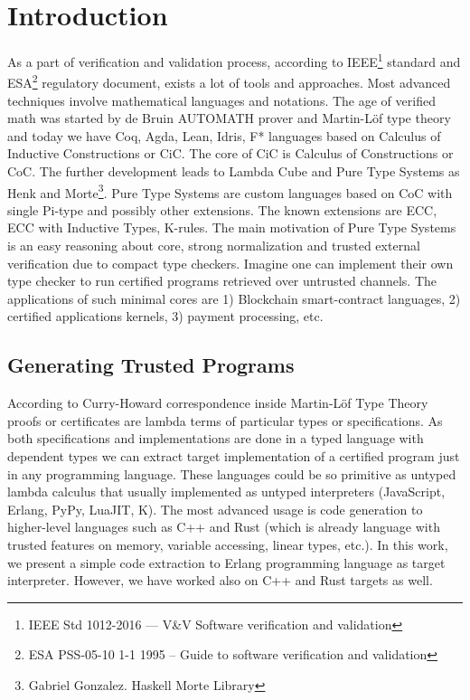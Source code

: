 \documentclass{aip-cp}
\begin{document}
\section{Introduction}
As a part of verification and validation process, according to IEEE\footnote{IEEE Std 1012-2016  --- V\&V Software verification and validation} standard
and ESA\footnote{ESA PSS-05-10 1-1 1995 -- Guide to software verification and validation} regulatory document,
exists a lot of tools and approaches. Most advanced techniques
involve mathematical languages and notations. The age of verified math was
started by de Bruin AUTOMATH prover and Martin-Löf\cite{Lof84} type theory and today we have Coq, Agda, Lean, Idris, F* languages
based on Calculus of Inductive Constructions or CiC\cite{Mohring15}.
The core of CiC is Calculus of Constructions or CoC\cite{Coq88}.
The further development leads to Lambda Cube\cite{Henk93} and Pure Type Systems as Henk\cite{Erik97} and Morte\footnote{Gabriel Gonzalez. Haskell Morte Library}.
Pure Type Systems are custom languages based on CoC with single Pi-type and possibly other extensions.
The known extensions are ECC, ECC with Inductive Types\cite{Ore92}, K-rules\cite{Barthe95}.
The main motivation of Pure Type Systems is an easy reasoning about core,
strong normalization and trusted external verification due to compact type checkers.
Imagine one can implement their own type checker to run certified
programs retrieved over untrusted channels. The applications of
such minimal cores are 1) Blockchain smart-contract languages,
2) certified applications kernels, 3) payment processing, etc.

\subsection{Generating Trusted Programs}
According to Curry-Howard correspondence inside Martin-Löf Type Theory\cite{Lof84}
proofs or certificates are lambda terms of particular types or specifications.
As both specifications and implementations are done in a typed
language with dependent types we can extract target implementation of a certified program just
in any programming language. These languages could be so
primitive as untyped lambda calculus that usually implemented as
untyped interpreters (JavaScript, Erlang, PyPy, LuaJIT, K).
The most advanced usage is code generation to higher-level
languages such as C++ and Rust (which is already language with trusted
features on memory, variable accessing, linear types, etc.). In this work, we present a
simple code extraction to Erlang programming language as target interpreter.
However, we have worked also on C++ and Rust targets as well.
\end{document}
